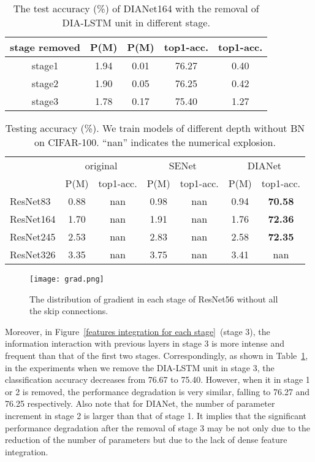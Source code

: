 \documentclass[letterpaper]{article} \usepackage{aaai20}  \usepackage{times}  \usepackage{helvet} \usepackage{courier}  \usepackage[hyphens]{url}  \usepackage{graphicx} \urlstyle{rm} \def\UrlFont{\rm}  \usepackage{graphicx}  \frenchspacing  \setlength{\pdfpagewidth}{8.5in}  \setlength{\pdfpageheight}{11in}  \usepackage{color}
\begin{document}
	\begin{table}[h]
			\small
			\centering
			\begin{tabular}{|c|c|c|c|c|}
				\toprule
				stage removed& P(M) & P(M) & top1-acc. & top1-acc. \\
				\midrule
				stage1 & 1.94  & 0.01  & 76.27 & 0.40 \\
				stage2 & 1.90   & 0.05  & 76.25 & 0.42 \\
				stage3 & 1.78  & 0.17  & 75.40  & 1.27 \\
				\bottomrule
			\end{tabular}\caption{The test accuracy (\%) of DIANet164 with the removal of DIA-LSTM unit in different stage.}
    \label{tab:remove stage}
\end{table}
\begin{table*}[ht]
		\small
		\centering
		\begin{tabular}{|l|c|c|c|c|c|c|}
			\toprule
			& \multicolumn{2}{c|}{original} & \multicolumn{2}{c|}{SENet} & \multicolumn{2}{c|}{DIANet} \\
			\cmidrule{2-7}          & P(M) & top1-acc. & P(M) & top1-acc. & P(M) & top1-acc. \\
			\midrule
			ResNet83 & 0.88  & nan   & 0.98  & nan   & 0.94  & \textbf{70.58 } \\
			ResNet164 & 1.70  & nan   & 1.91  & nan   & 1.76  & \textbf{72.36 } \\
			ResNet245 & 2.53  & nan   & 2.83  & nan   & 2.58  & \textbf{72.35 } \\
			ResNet326 & 3.35  & nan   & 3.75  & nan   & 3.41  & nan \\
			\bottomrule
		\end{tabular}\caption{Testing accuracy (\%). We train models of different depth without BN on CIFAR-100. ``nan'' indicates the numerical explosion. }
		\label{tab:withoutbn}\end{table*}\begin{figure*}[h]
    \centering
    \texttt{[image: grad.png]}
    \caption{The distribution of gradient in each stage of ResNet56 without all the skip connections.}
    \label{fig:gradient}
\end{figure*}
	Moreover, in Figure~\ref{features integration for each stage}~(stage 3), the information interaction with previous layers in stage 3 is more intense and frequent than that of the first two stages. Correspondingly, as shown in Table~\ref{tab:remove stage}, in the experiments when we remove the DIA-LSTM unit in stage 3, the classification accuracy decreases from 76.67 to 75.40. However, when it in stage 1 or 2 is removed, the performance degradation is very similar, falling to 76.27 and 76.25 respectively. Also note that for DIANet, the number of parameter increment in stage 2 is larger than that of stage 1. It implies that the significant performance degradation after the removal of stage 3 may be not only due to the reduction of the number of parameters but due to the lack of dense feature integration.
\end{document}

